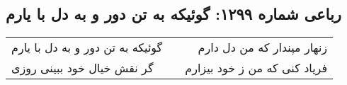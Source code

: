 \begin{center}
\section*{رباعی شماره ۱۲۹۹: گوئیکه به تن دور و به دل با یارم}
\label{sec:1299}
\begin{longtable}{l p{0.5cm} r}
گوئیکه به تن دور و به دل با یارم
&&
زنهار مپندار که من دل دارم
\\
گر نقش خیال خود ببینی روزی
&&
فریاد کنی که من ز خود بیزارم
\\
\end{longtable}
\end{center}
